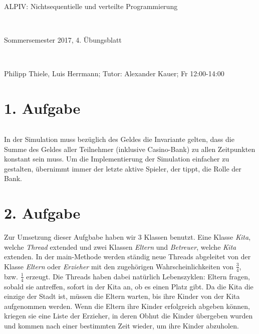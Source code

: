 \documentclass[numbers=noendperiod]{scrartcl}
\begin{document}
	
	
\hrulefill
\begin{center}
	\bfseries %
	\sffamily %
	\begin{huge}
		ALPIV: Nichtsequentielle und verteilte Programmierung
	\end{huge}\\
	\begin{Large}
		Sommersemester 2017, 4. Übungsblatt
	\end{Large}\\
	\begin{small}
		Philipp Thiele, Luis Herrmann; Tutor: Alexander Kauer; Fr 12:00-14:00
	\end{small}
	
	\vspace{-10pt}
\end{center}
\hrulefill

\newcommand{\inputmintedframed}[2]{
	\begin{mdframed}[linecolor=bg,backgroundcolor=bg]
		\inputminted[mathescape,breaklines,linenos,numbersep=5pt,tabsize=3]{#1}{#2}
\end{mdframed}}

\section*{1. Aufgabe}

\inputmintedframed{java}{src/Gambler.java}

In der Simulation muss bezüglich des Geldes die Invariante gelten, dass die Summe des Geldes aller Teilnehmer (inklusive Casino-Bank) zu allen Zeitpunkten konstant sein muss. Um die Implementierung der Simulation einfacher zu gestalten, übernimmt immer der letzte aktive Spieler, der tippt, die Rolle der Bank.


\section*{2. Aufgabe}

Zur Umsetzung dieser Aufgbabe haben wir 3 Klassen benutzt. Eine Klasse \textit{Kita}, welche \textit{Thread} extended und zwei Klassen \textit{Eltern} und \textit{Betreuer}, welche \textit{Kita} extenden. In der main-Methode werden ständig neue Threads abgeleitet von der Klasse \textit{Eltern} oder \textit{Erzieher} mit den zugehörigen Wahrscheinlichkeiten von $\frac{3}{4}$, bzw. $\frac{1}{4}$ erzeugt. Die Threads haben dabei natürlich Lebenszyklen: Eltern fragen, sobald sie antreffen, sofort in der Kita an, ob es einen Platz gibt. Da die Kita die einzige der Stadt ist, müssen die Eltern warten, bis ihre Kinder von der Kita aufgenommen werden. Wenn die Eltern ihre Kinder erfolgreich abgeben können, kriegen sie eine Liste der Erzieher, in deren Obhut die Kinder übergeben wurden und kommen nach einer bestimmten Zeit wieder, um ihre Kinder abzuholen.
\end{document}
